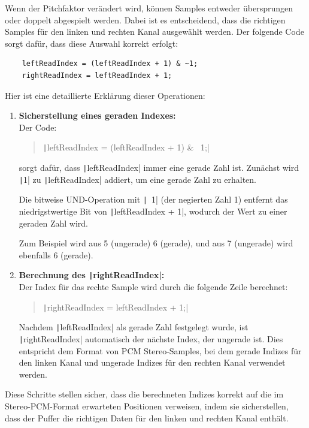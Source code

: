 Wenn der Pitchfaktor verändert wird, können Samples entweder übersprungen oder doppelt abgespielt werden. Dabei ist es entscheidend, dass die richtigen Samples für den linken und rechten Kanal ausgewählt werden. Der folgende Code sorgt dafür, dass diese Auswahl korrekt erfolgt:

\begin{verbatim}
	leftReadIndex = (leftReadIndex + 1) & ~1;
	rightReadIndex = leftReadIndex + 1;
\end{verbatim}


\noindent
Hier ist eine detaillierte Erklärung dieser Operationen:

\begin{enumerate}
	\item \textbf{Sicherstellung eines geraden Indexes:} \\
	Der Code:
	\begin{quote}
		\texttt|leftReadIndex = (leftReadIndex + 1) & ~1;|
	\end{quote}
	sorgt dafür, dass \texttt|leftReadIndex| immer eine gerade Zahl ist. Zunächst wird \texttt|1| zu \texttt|leftReadIndex| addiert, um eine gerade Zahl zu erhalten. 
	
	Die bitweise UND-Operation mit \texttt|~1| (der negierten Zahl 1) entfernt das niedrigstwertige Bit von \texttt|leftReadIndex + 1|, wodurch der Wert zu einer geraden Zahl wird. 
	
	Zum Beispiel wird aus 5 (ungerade) 6 (gerade), und aus 7 (ungerade) wird ebenfalls 6 (gerade).
	
	\item \textbf{Berechnung des \texttt|rightReadIndex|:} \\
	Der Index für das rechte Sample wird durch die folgende Zeile berechnet:
	\begin{quote}
		\texttt|rightReadIndex = leftReadIndex + 1;|
	\end{quote}
	Nachdem \texttt|leftReadIndex| als gerade Zahl festgelegt wurde, ist \texttt|rightReadIndex| automatisch der nächste Index, der ungerade ist. Dies entspricht dem Format von PCM Stereo-Samples, bei dem gerade Indizes für den linken Kanal und ungerade Indizes für den rechten Kanal verwendet werden.
\end{enumerate}

Diese Schritte stellen sicher, dass die berechneten Indizes korrekt auf die im Stereo-PCM-Format erwarteten Positionen verweisen, indem sie sicherstellen, dass der Puffer die richtigen Daten für den linken und rechten Kanal enthält.



